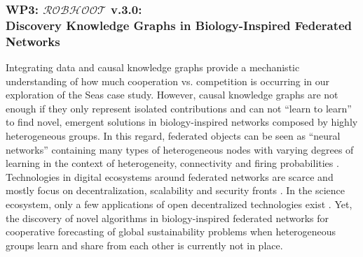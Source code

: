 \documentclass[11pt, a4paper]{article} %
\begin{document}
\subsubsection{{\bf WP3: $\mathcal{ROBHOOT}$ v.3.0}: \\
  Discovery Knowledge Graphs in Biology-Inspired Federated Networks}

Integrating data and causal knowledge graphs provide a mechanistic
understanding of how much cooperation vs. competition is occurring in
our exploration of the Seas case study. However, causal knowledge
graphs are not enough if they only represent isolated contributions
and can not ``learn to learn'' to find novel, emergent solutions in
biology-inspired networks composed by highly heterogeneous groups. In
this regard, federated objects can be seen as ``neural networks''
containing many types of heterogeneous nodes with varying degrees of
learning in the context of heterogeneity, connectivity and firing
probabilities \citep{Maass2014,Maass2015}. Technologies in digital
ecosystems around federated networks are scarce and mostly focus on
decentralization, scalability and security fronts
\citep{Golem2016,Dilley2016,Durov2017,Androulaki2018,OceanProtocolFoundation2018,BigchainDBGmbH2018}. In
the science ecosystem, only a few applications of open decentralized
technologies exist \citep{Gunther2018}. Yet, the discovery of novel
algorithms in biology-inspired federated networks for cooperative
forecasting of global sustainability problems when heterogeneous
groups learn and share from each other is currently not in place.
\end{document}
